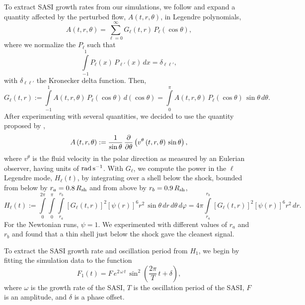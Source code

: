 To extract SASI growth rates from our simulations,
we follow \citet{bm2006} and expand a quantity
affected by the perturbed flow,
$A\left(t,r,\theta\right)$, in Legendre polynomials,
\begin{equation}
  A\left(t,r,\theta\right)
  =\sum\limits_{\ell=0}^{\infty}
  G_{\ell}\left(t,r\right)\,P_{\ell}\left(\cos\theta\right),
\end{equation}
where we normalize the $P_{\ell}$ such that
\begin{equation}
  \int\limits_{-1}^{1}P_{\ell}\left(x\right)\,P_{\ell'}\left(x\right)\,dx
  =\delta_{\ell\ell'},
\end{equation}
with $\delta_{\ell\ell'}$ the Kronecker delta function.
Then,
\begin{equation}
  G_{\ell}\left(t,r\right):=
  \int\limits_{-1}^{1}A\left(t,r,\theta\right)\,
  P_{\ell}\left(\cos\theta\right)\,d\left(\cos\theta\right)
  =\int\limits_{0}^{\pi}
  A\left(t,r,\theta\right)\,P_{\ell}\left(\cos\theta\right)\,
  \sin\theta\,d\theta.
\end{equation}
After experimenting with several quantities,
we decided to use the quantity proposed by \citet{sjf2008},
\begin{equation}
  A\left(t,r,\theta\right)
  :=\frac{1}{\sin\theta}\,\frac{\partial}{\partial\theta}
  \left(v^{\theta}\left(t,r,\theta\right)\,\sin\theta\right),
\end{equation}
where $v^{\theta}$ is the fluid velocity in the polar direction
as measured by an Eulerian observer,
having units of $\mathrm{rad}\,\mathrm{s}^{-1}$.
With $G_{\ell}$, we compute the power in the $\ell$\th{} Legendre mode,
$H_{\ell}\left(t\right)$, by integrating over a shell below the shock,
bounded from below by $r_{a}=0.8\,R_{\mathrm{sh}}$ and from above
by $r_{b}=0.9\,R_{\mathrm{sh}}$,
\begin{equation}
  H_{\ell}\left(t\right):=
  \int\limits_{0}^{2\pi}\int\limits_{0}^{\pi}
  \int\limits_{r_{a}}^{r_{b}}
  \left[G_{\ell}\left(t,r\right)\right]^{2}
  \left[\psi\left(r\right)\right]^{6}r^{2}\,\sin\theta\,dr\,d\theta\,d\varphi
  =4\pi\int\limits_{r_{a}}^{r_{b}}
  \left[G_{\ell}\left(t,r\right)\right]^{2}
  \left[\psi\left(r\right)\right]^{6}r^{2}\,dr.
\end{equation}
For the Newtonian runs, $\psi=1$.
We experimented with different values of $r_{a}$ and $r_{b}$
and found that a thin shell just below the shock gave the cleanest signal.

To extract the SASI growth rate and oscillation period from $H_{1}$,
we begin by fitting the simulation data to the function \citep{bm2006}
\begin{equation}
  F_{1}\left(t\right)
  =F\,e^{2\,\omega\,t}\,
  \sin^{2}\left(\frac{2\pi}{T}\,t+\delta\right),
  \label{eq.AP.H1Fit}
\end{equation}
where $\omega$ is the growth rate of the SASI, $T$ is the
oscillation period of the SASI,
$F$ is an amplitude, and $\delta$ is a phase offset.

